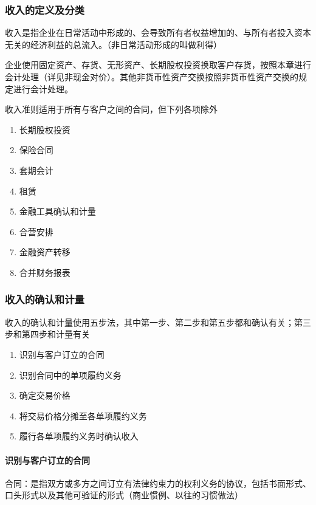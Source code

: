 \documentclass[UTF8,12pt]{ctexart}
\numberwithin{equation}{section} %
\numberwithin{figure}{section}
\numberwithin{table}{section}
\begin{document}
	\subsubsection{收入的定义及分类}
	收入是指企业在日常活动中形成的、会导致所有者权益增加的、与所有者投入资本无关的经济利益的总流入。（非日常活动形成的叫做利得）
	
	企业使用固定资产、存货、无形资产、长期股权投资换取客户存货，按照本章进行会计处理（详见非现金对价）。其他非货币性资产交换按照非货币性资产交换的规定进行会计处理。
	
	收入准则适用于所有与客户之间的合同，但下列各项除外
	\begin{enumerate}
		\item 长期股权投资
		
		\item 保险合同
		
		\item 套期会计
		
		\item 租赁
		
		\item 金融工具确认和计量
		
		\item 合营安排
		
		\item 金融资产转移
		
		\item 合并财务报表
	\end{enumerate}

	\subsubsection{收入的确认和计量}
	收入的确认和计量使用五步法，其中第一步、第二步和第五步都和确认有关；第三步和第四步和计量有关
	\begin{enumerate}
		\item 识别与客户订立的合同
		
		\item 识别合同中的单项履约义务
		
		\item 确定交易价格
		
		\item 将交易价格分摊至各单项履约义务
		
		\item 履行各单项履约义务时确认收入
	\end{enumerate}
	\paragraph{识别与客户订立的合同}
	合同：是指双方或多方之间订立有法律约束力的权利义务的协议，包括书面形式、口头形式以及其他可验证的形式（商业惯例、以往的习惯做法）
	
\end{document}
